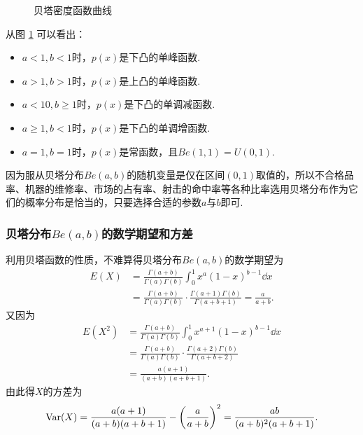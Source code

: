 \begin{figure}
{
}
  \caption{贝塔密度函数曲线}\label{fig2.5.6}
\end{figure}

从图 \ref{fig2.5.6} 可以看出：

\begin{itemize}
  \item $a<1,b<1$时，$p(x)$是下凸的单峰函数.

  \item $a>1,b>1$时，$p(x)$是上凸的单峰函数.

  \item $a<10,b\ge1$时，$p(x)$是下凸的单调减函数.

  \item $a\ge1,b<1$时，$p(x)$是下凸的单调增函数.

  \item $a=1,b=1$时，$p(x)$是常函数，且$Be(1,1)=U(0,1)$.
\end{itemize}

因为服从贝塔分布$Be(a,b)$的随机变量是仅在区间$(0,1)$取值的，所以不合格品率、机器的维修率、市场的占有率、射击的命中率等各种比率选用贝塔分布作为它们的概率分布是恰当的，只要选择合适的参数$a$与$b$即可.

\subsubsection{贝塔分布$Be(a,b)$的数学期望和方差}
利用贝塔函数的性质，不难算得贝塔分布$Be(a,b)$的数学期望为
\begin{align*}
  E(X) & = \frac{\Gamma(a+b)}{\Gamma(a)\Gamma(b)}
    \int_0^1 x^a(1-x)^{b-1} \dd x \\
    & = \frac{\Gamma(a+b)}{\Gamma(a)\Gamma(b)}\cdot
    \frac{\Gamma(a+1)\Gamma(b)}{\Gamma(a+b+1)} = \frac a{a+b}.
\end{align*}
又因为
\begin{align*}
  E(X^2) & = \frac{\Gamma(a+b)}{\Gamma(a)\Gamma(b)}
    \int_0^1 x^{a+1}(1-x)^{b-1} \dd x  \\
    & = \frac{\Gamma(a+b)}{\Gamma(a)\Gamma(b)}\cdot
    \frac{\Gamma(a+2)\Gamma(b)}{\Gamma(a+b+2)} \\
    & = \frac{a(a+1)}{(a+b)(a+b+1)}.
\end{align*}
由此得$X$的方差为
\[
  \Var(X) = \frac{a(a+1)}{(a+b)(a+b+1)} - \left(\frac a{a+b}\right)^2 =
  \frac{ab}{(a+b)^2(a+b+1)}.
\]

